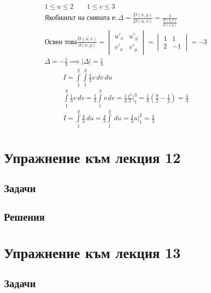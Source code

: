 \documentclass[a4paper,fleqn,12pt]{article}
\theoremstyle{definition}
\begin{document}
\begin{itemize}
\begin{gather*}
1 \leq u \leq 2 \qquad 1 \leq v \leq 3 \\
\text{Якобианът на смяната е}:
\Delta = \frac{D(x,y)}{D(u,v)} = \frac{1}{\frac{D(u,v)}{D(x,y)}}\\
\text{Освен това}
\frac{D(u,v)}{\partial (x,y)} = \begin{vmatrix} u'_x & u'_y \\ v'_x & v'_y \end{vmatrix} =  \begin{vmatrix} 1 & 1\\ 2 & -1 \end{vmatrix} =-3 \\
\Delta = - \frac{1}{3} \implies |\Delta| = \frac{1}{3} 
\end{gather*}
\begin{gather*}
I = \int\limits_1 ^2 \int\limits_1 ^3 \frac{1}{3}v \, dv \ du \\
\int\limits_1 ^3 \frac{1}{3}v \, dv  =
\frac{1}{3} \int\limits_1 ^3 v \, dv =
\frac{1}{3} \frac{v^2}{2} \Big|_1 ^3 = 
\frac{1}{3} \left( \frac{9}{2} - \frac{1}{2}\right) = \frac{4}{3} \\
I = \int\limits_1 ^2  \frac{4}{3} \, du = 
\frac{4}{3} \int\limits_1 ^2  \, du = 
\frac{4}{3} u\Big|_1 ^2 = \frac{4}{3}
\end{gather*}
\end{itemize}

\newpage 
\section{Упражнение към лекция 12}

\subsection{Задачи}

\newpage
\subsection{Решения}

\newpage 
\section{Упражнение към лекция 13}

\subsection{Задачи}

\newpage
\end{document}
